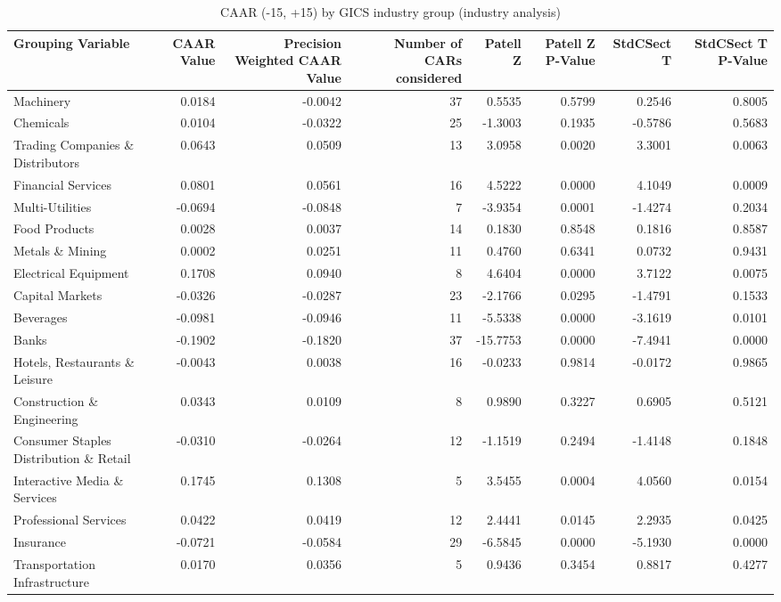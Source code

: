 \begin{table}
\caption{CAAR (-15, +15) by GICS industry group (industry analysis)}
\label{tab:industry_caar}
\begin{tabular}{lrrrrrrr}
\toprule
Grouping Variable & CAAR Value & Precision Weighted CAAR Value & Number of CARs considered & Patell Z & Patell Z P-Value & StdCSect T & StdCSect T P-Value \\
\midrule
Machinery & 0.0184 & -0.0042 & 37 & 0.5535 & 0.5799 & 0.2546 & 0.8005 \\
Chemicals & 0.0104 & -0.0322 & 25 & -1.3003 & 0.1935 & -0.5786 & 0.5683 \\
Trading Companies \& Distributors & 0.0643 & 0.0509 & 13 & 3.0958 & 0.0020 & 3.3001 & 0.0063 \\
Financial Services & 0.0801 & 0.0561 & 16 & 4.5222 & 0.0000 & 4.1049 & 0.0009 \\
Multi-Utilities & -0.0694 & -0.0848 & 7 & -3.9354 & 0.0001 & -1.4274 & 0.2034 \\
Food Products & 0.0028 & 0.0037 & 14 & 0.1830 & 0.8548 & 0.1816 & 0.8587 \\
Metals \& Mining & 0.0002 & 0.0251 & 11 & 0.4760 & 0.6341 & 0.0732 & 0.9431 \\
Electrical Equipment & 0.1708 & 0.0940 & 8 & 4.6404 & 0.0000 & 3.7122 & 0.0075 \\
Capital Markets & -0.0326 & -0.0287 & 23 & -2.1766 & 0.0295 & -1.4791 & 0.1533 \\
Beverages & -0.0981 & -0.0946 & 11 & -5.5338 & 0.0000 & -3.1619 & 0.0101 \\
Banks & -0.1902 & -0.1820 & 37 & -15.7753 & 0.0000 & -7.4941 & 0.0000 \\
Hotels, Restaurants \& Leisure & -0.0043 & 0.0038 & 16 & -0.0233 & 0.9814 & -0.0172 & 0.9865 \\
Construction \& Engineering & 0.0343 & 0.0109 & 8 & 0.9890 & 0.3227 & 0.6905 & 0.5121 \\
Consumer Staples Distribution \& Retail & -0.0310 & -0.0264 & 12 & -1.1519 & 0.2494 & -1.4148 & 0.1848 \\
Interactive Media \& Services & 0.1745 & 0.1308 & 5 & 3.5455 & 0.0004 & 4.0560 & 0.0154 \\
Professional Services & 0.0422 & 0.0419 & 12 & 2.4441 & 0.0145 & 2.2935 & 0.0425 \\
Insurance & -0.0721 & -0.0584 & 29 & -6.5845 & 0.0000 & -5.1930 & 0.0000 \\
Transportation Infrastructure & 0.0170 & 0.0356 & 5 & 0.9436 & 0.3454 & 0.8817 & 0.4277 \\

\end{tabular}
\end{table}
